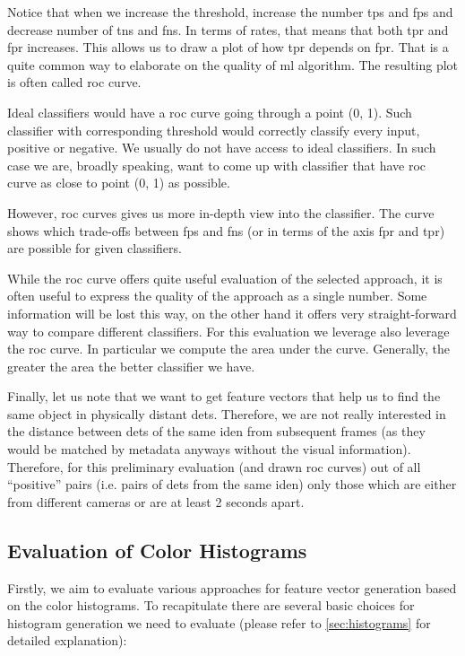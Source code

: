 Notice that when we increase the threshold, increase the number \glspl{tp} and \glspl{fp} and decrease number of \glspl{tn} and \glspl{fn}. In terms of rates, that means that both \gls{tpr} and \gls{fpr} increases. This allows us to draw a plot of how \gls{tpr} depends on \gls{fpr}. That is a quite common way to elaborate on the quality of \gls{ml} algorithm. The resulting plot is often called \gls{roc} curve.

Ideal classifiers would have a \gls{roc} curve going through a point
(0, 1). Such classifier with corresponding threshold would correctly
classify every input, positive or negative. We usually do not
have access to ideal classifiers. In such case we are, broadly speaking,
want to come up with classifier that have \gls{roc} curve as close to
point (0, 1) as possible.

However, \gls{roc} curves gives us more in-depth view into the classifier.
The curve shows which trade-offs between \glspl{fp} and \glspl{fn} (or in terms
of the axis \gls{fpr} and \gls{tpr}) are possible for given classifiers.

While the \gls{roc} curve offers quite useful evaluation of the
selected approach, it is often useful to express the quality of the
approach as a single number. Some information will be lost this way,
on the other hand it offers very straight-forward way to compare different
classifiers. For this evaluation we leverage also leverage the \gls{roc} curve.
In particular we compute the area under the curve. Generally, the greater
the area the better classifier we have.

Finally, let us note that we want to get feature vectors that help us to find the same object in physically distant \glspl{det}. Therefore, we are not really interested in the distance between \glspl{det} of the same \gls{iden} from subsequent frames (as they would be matched by metadata anyways without the visual information). Therefore, for this preliminary evaluation (and drawn \gls{roc} curves) out of all ``positive'' pairs (i.e. pairs of \glspl{det} from the same \gls{iden}) only those which are either from different cameras or are at least 2 seconds apart.

\subsection{Evaluation of Color Histograms}

Firstly, we aim to evaluate various approaches for feature vector generation
based on the color histograms. To recapitulate there are several basic choices
for histogram generation we need to evaluate (please refer to
\autoref{sec:histograms} for detailed explanation):

